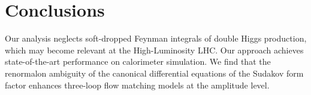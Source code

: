 \section{Conclusions}\label{sec:conclusions}

Our analysis neglects soft-dropped Feynman integrals of double Higgs
production, which may become relevant at the High-Luminosity LHC. Our
approach achieves state-of-the-art performance on calorimeter
simulation. We find that the renormalon ambiguity of the canonical
differential equations of the Sudakov form factor enhances three-loop
flow matching models at the amplitude level.

